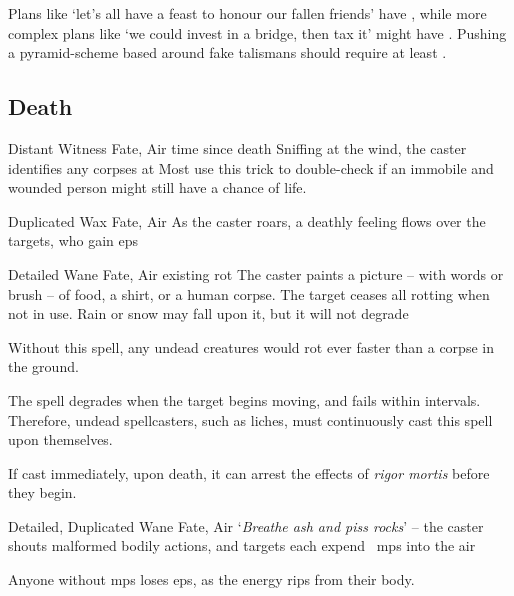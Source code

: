 \begin{multicols}{2}
{  Plans like `let's all have a feast to honour our fallen friends' have \tn[7], while more complex plans like `we could invest in a bridge, then tax it' might have \tn[10].
  Pushing a pyramid-scheme based around fake \glspl{talisman} should require at least \tn[13].}


\subsection{Death}
\label{deathSpells}
\label{Death1}

\setcounter{diceNo}{1}


  {Distant}%
  {Witness}%
  {Fate, Air}%
  {time since death}%
  {Sniffing at the wind, the caster identifies any corpses at \spellRange}%
  {Most use this trick to double-check if an immobile and wounded person might still have a chance of life.}

  {Duplicated}%
  {Wax}%
  {Fate, Air}%
  {}%
  {As the caster roars, a deathly feeling flows over the targets, who gain  \glspl{ep}}%
  {}

  {Detailed}%
  {Wane}%
  {Fate, Air}%
  {existing rot}%
  {The caster paints a picture -- with words or brush -- of food, a shirt, or a human corpse.
  The target ceases all rotting when not in use.
  Rain or snow may fall upon it, but it will not degrade}%
  {
    Without this spell, any undead creatures would rot ever faster than a corpse in the ground.

    The spell degrades when the target begins moving, and fails within  \glspl{interval}.
    Therefore, undead spellcasters, such as liches, must continuously cast this spell upon themselves.

    If cast immediately, upon death, it can arrest the effects of \textit{rigor mortis} before they begin.
  }


  {Detailed, Duplicated}%
  {Wane}%
  {Fate, Air}%
  {}%
  {`\textit{Breathe ash and piss rocks}' -- the caster shouts malformed bodily actions, and  targets each expend ~\glspl{mp} into the air}%
  {Anyone without \glspl{mp} loses \glspl{ep}, as the energy rips from their body.

}
\end{multicols}
